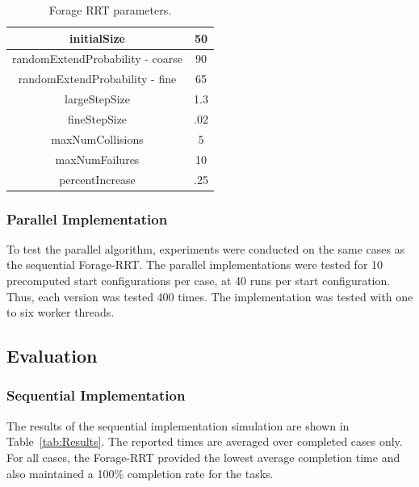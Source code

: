 \documentclass[conference]{IEEEtran}
\begin{document}
\begin{table}
  \centering
  \caption{Forage RRT parameters. \label{tab:ForageParams}}
  \begin{tabular}{| c | c | }
    \hline
	initialSize & 50 \\ \hline
  	randomExtendProbability - coarse & 90 \\ \hline
  	randomExtendProbability - fine & 65 \\ \hline
  	largeStepSize & 1.3\\ \hline
  	fineStepSize & .02\\ \hline
  	maxNumCollisions & 5\\ \hline
  	maxNumFailures & 10\\ \hline
	percentIncrease & .25\\ \hline 
  \end{tabular}
\end{table}

\subsubsection{Parallel Implementation}
To test the parallel algorithm, experiments were conducted on the same cases
as the sequential Forage-RRT. The parallel implementations were tested for
10 precomputed start configurations per case, at 40 runs per start
configuration. Thus, each version was tested 400 times. The implementation
was tested with one to six worker threads. 

\subsection{Evaluation}

\subsubsection{Sequential Implementation}
The results of the sequential implementation simulation are shown in 
Table~\ref{tab:Results}. The reported times are averaged over completed
cases only.  For all cases, the Forage-RRT provided the lowest average
completion time and also maintained a 100\% completion rate for the tasks.
\end{document}
